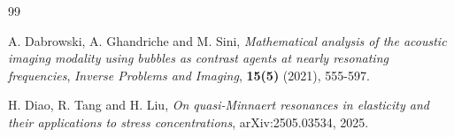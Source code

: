 \documentclass[11pt,reqno,twoside]{amsart}
\theoremstyle{definition}
\theoremstyle{remark}
\numberwithin{equation}{section}
\begin{document}
\begin{thebibliography}{99}
	
	
	
	
	
	
	
	
	A. Dabrowski, A. Ghandriche and M. Sini, {\it Mathematical analysis of the acoustic imaging modality using bubbles as contrast agents at nearly resonating frequencies}, {\emph{Inverse Problems and Imaging}}, \textbf{15(5)} (2021), 555-597.
	
	H. Diao, R. Tang and H. Liu, {\it On quasi-Minnaert resonances in elasticity and their applications to stress concentrations}, arXiv:2505.03534, 2025.
	
	
	
	
	

\end{thebibliography}
\end{document}
